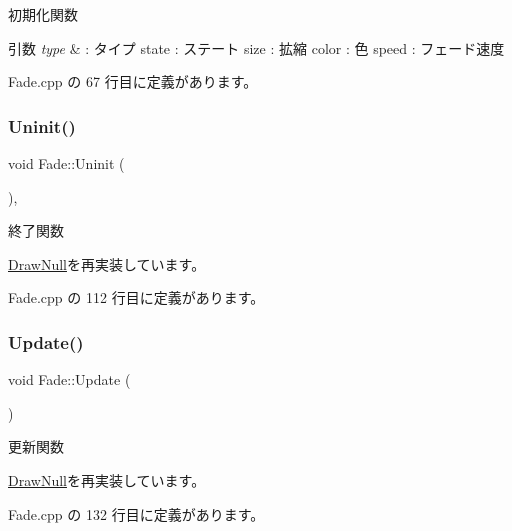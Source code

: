 初期化関数 


\begin{DoxyParams}{引数}
{\em type} & \+: タイプ state \+: ステート size \+: 拡縮 color \+: 色 speed \+: フェード速度 \\
\hline
\end{DoxyParams}


 Fade.\+cpp の 67 行目に定義があります。

\mbox{\label{class_fade_ae77d06811869d3c8162a42c3e0e14f7f}} 
\subsubsection{\texorpdfstring{Uninit()}{Uninit()}}
{\footnotesize\ttfamily void Fade\+::\+Uninit (\begin{DoxyParamCaption}{ }\end{DoxyParamCaption})\hspace{0.3cm}{\ttfamily [override]}, {\ttfamily [virtual]}}



終了関数 



\mbox{\hyperlink{class_draw_null_a12d44e341c7364b5ab9cdd661dc16187}{Draw\+Null}}を再実装しています。



 Fade.\+cpp の 112 行目に定義があります。

\mbox{\label{class_fade_a1579b5b9020344a1131ea11c15f2c0bd}} 
\subsubsection{\texorpdfstring{Update()}{Update()}}
{\footnotesize\ttfamily void Fade\+::\+Update (\begin{DoxyParamCaption}{ }\end{DoxyParamCaption})\hspace{0.3cm}{\ttfamily [virtual]}}



更新関数 



\mbox{\hyperlink{class_draw_null_a0149bcf84a34b138642ab7975ae46f30}{Draw\+Null}}を再実装しています。



 Fade.\+cpp の 132 行目に定義があります。



